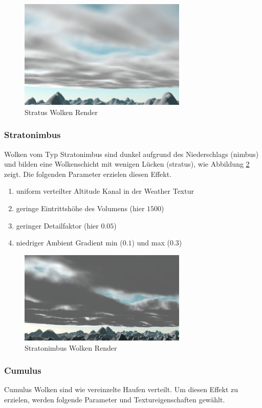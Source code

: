\begin{figure}[H]
    \centering
    \includegraphics[width=8cm]{media/stratus.png}
    \caption{Stratus Wolken Render}
    \label{fig:stratus}
\end{figure}

\subsubsection{Stratonimbus}
Wolken vom Typ Stratonimbus sind dunkel aufgrund des Niederschlags (nimbus) und bilden eine Wolkenschicht mit wenigen Lücken (stratus), wie Abbildung \ref{fig:stratonimbus} zeigt. Die folgenden Parameter erzielen diesen Effekt.

\begin{enumerate}
    \item uniform verteilter Altitude Kanal in der Weather Textur
    \item geringe Eintrittshöhe des Volumens (hier $ 1500 $)
    \item geringer Detailfaktor (hier $ 0.05 $)
    \item niedriger Ambient Gradient min ($ 0.1 $) und max ($ 0.3 $)
\end{enumerate}

\begin{figure}[H]
    \centering
    \includegraphics[width=8cm]{media/stratonimbus.png}
    \caption{Stratonimbus Wolken Render}
    \label{fig:stratonimbus}
\end{figure}

\subsubsection{Cumulus}
Cumulus Wolken sind wie vereinzelte Haufen verteilt. Um diesen Effekt zu erzielen, werden folgende Parameter und Textureigenschaften gewählt.

